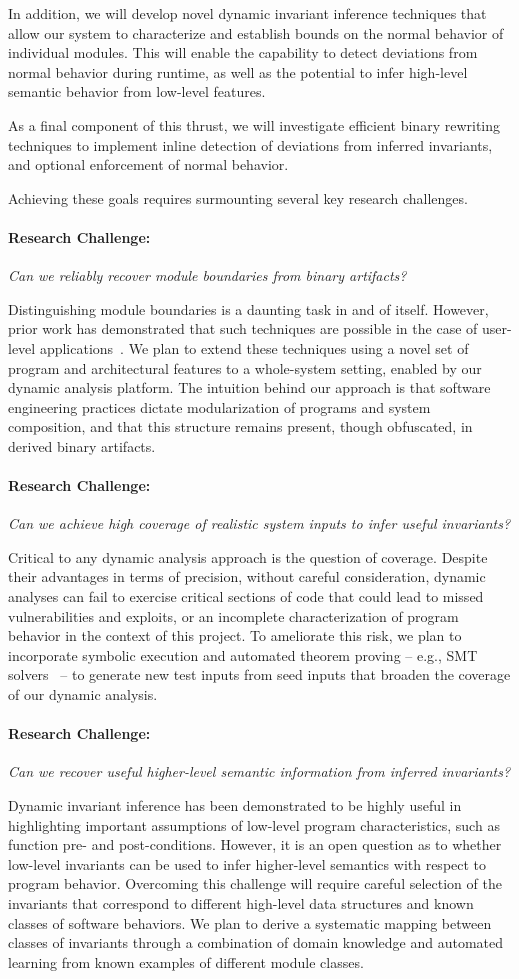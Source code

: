 \documentclass[letterpaper,twoside,11pt,headings=small]{scrartcl}
\newcommand{\challenge}[1]{\paragraph{Research Challenge:} \emph{#1}}
\begin{document}
In addition, we will develop novel dynamic invariant inference techniques that
allow our system to characterize and establish bounds on the normal behavior
of individual modules.  This will enable the capability to detect deviations
from normal behavior during runtime, as well as the potential to infer high-level
semantic behavior from low-level features.

As a final component of this thrust, we will investigate efficient binary
rewriting techniques to implement inline detection of deviations from inferred
invariants, and optional enforcement of normal behavior.

Achieving these goals requires surmounting several key research challenges.

\challenge{Can we reliably recover module boundaries from binary artifacts?}

Distinguishing module boundaries is a daunting task in and of itself.  However,
prior work has demonstrated that such techniques are possible in the case of
user-level applications~\cite{bittau:nsdi2008:wedge}.  We plan to extend these
techniques using a novel set of program and architectural features to a whole-system
setting, enabled by our dynamic analysis platform.  The intuition behind our
approach is that software engineering practices dictate modularization of
programs and system composition, and that this structure remains present,
though obfuscated, in derived binary artifacts.

\challenge{Can we achieve high coverage of realistic system inputs to infer useful invariants?}

Critical to any dynamic analysis approach is the question of coverage. Despite
their advantages in terms of precision, without careful consideration, dynamic
analyses can fail to exercise critical sections of code that could lead to
missed vulnerabilities and exploits, or an incomplete characterization of
program behavior in the context of this project.  To ameliorate this risk, we
plan to incorporate symbolic execution and automated theorem proving -- e.g.,
SMT solvers~\cite{demoura:tacas2008:z3,zheng:fse2013:z3str} -- to generate new test inputs from
seed inputs that broaden the coverage of our dynamic analysis.

\challenge{Can we recover useful higher-level semantic information from inferred invariants?}

Dynamic invariant inference has been demonstrated to be highly useful in
highlighting important assumptions of low-level program characteristics, such
as function pre- and post-conditions.  However, it is an open question as to
whether low-level invariants can be used to infer higher-level semantics with
respect to program behavior.  Overcoming this challenge will require careful
selection of the invariants that correspond to different high-level data
structures and known classes of software behaviors.  We plan to derive a
systematic mapping between classes of invariants through a combination of
domain knowledge and automated learning from known examples of different
module classes.
\end{document}
